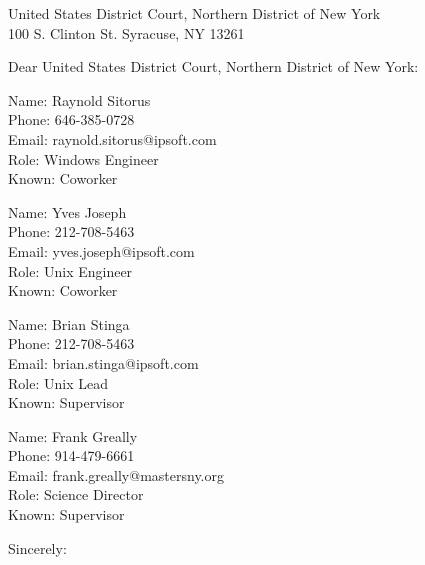 \documentclass[
    jphafner,
    fontsize=11pt,
    foldmarks=false,
    pagenumber=false,
    addrfield=true,
]{scrlttr2}
\date{\today}
\begin{document}
\begin{letter}{United States District Court, Northern District of New York \\
    100 S. Clinton St. Syracuse, NY 13261 \\}

\opening{Dear United States District Court, Northern District of New York:}

    Name: Raynold Sitorus \\
	Phone: 646-385-0728 \\
	Email: raynold.sitorus@ipsoft.com \\
        Role: Windows Engineer \\
	Known: Coworker


	Name: Yves Joseph \\
	Phone: 212-708-5463 \\
	Email: yves.joseph@ipsoft.com \\
	Role: Unix Engineer \\
	Known: Coworker 

	Name: Brian Stinga \\
	Phone: 212-708-5463 \\
	Email: brian.stinga@ipsoft.com \\
	Role: Unix Lead \\
	Known: Supervisor

	Name: Frank Greally \\
	Phone: 914-479-6661 \\
	Email: frank.greally@mastersny.org \\
	Role: Science Director \\
	Known: Supervisor
\closing{Sincerely:}
\end{letter}
\end{document}
